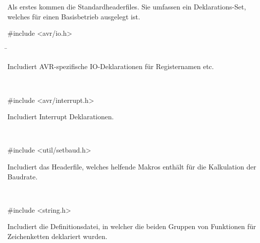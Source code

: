 Als erstes kommen die Standardheaderfiles. Sie umfassen ein Deklarations-Set, welches für einen Basisbetrieb ausgelegt ist.


\begin{tabbing}

\parbox[t]{.3\textwidth}{

\#include <avr/io.h>

} \=\parbox[t]{.75\textwidth}{

Includiert AVR-spezifische IO-Deklarationen für Registernamen etc.
\\

}\\


\parbox[t]{.3\textwidth}{

\#include <avr/interrupt.h>

} \>\parbox[t]{.75\textwidth}{

Includiert Interrupt Deklarationen.\\

}\\

\parbox[t]{.3\textwidth}{

\#include <util/setbaud.h>

} \>\parbox[t]{.75\textwidth}{

Includiert das Headerfile, welches helfende Makros enthält für die Kalkulation der Baudrate. \cite{klingelbiel_c_1999}\\

}\\

\parbox[t]{.3\textwidth}{

\#include <string.h>

} \>\parbox[t]{.75\textwidth}{

Includiert die Definitionsdatei, in welcher die beiden Gruppen von Funktionen für Zeichenketten deklariert wurden. \cite{doxygen_avr-libc:_2016}
}
\end{tabbing}

